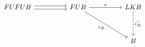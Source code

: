 \[\begin{tikzcd}
	FUFUB && FUB && LKB \\
	\\
	&&&& B
	\arrow["e", from=1-3, to=1-5]
	\arrow["{\epsilon_{B}}"', from=1-3, to=3-5]
	\arrow["{\epsilon'_{B}}", dashed, from=1-5, to=3-5]
	\arrow[shift left, from=1-1, to=1-3]
	\arrow[shift right, from=1-1, to=1-3]
\end{tikzcd}\]